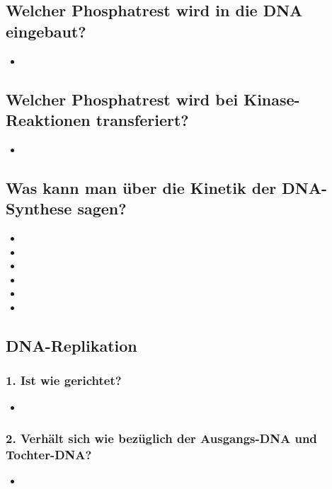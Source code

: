 \documentclass{article}
\begin{document}
\subsection*{Welcher Phosphatrest wird in die DNA eingebaut?}
\begin{itemize}     \item  \end{itemize}

\subsection*{Welcher Phosphatrest wird bei Kinase-Reaktionen transferiert?}
\begin{itemize}     \item  \end{itemize}
 
\subsection*{Was kann man über die Kinetik der DNA-Synthese sagen?}
\begin{itemize}
    \item 
    \item 
    \item 
    \item 
    \item 
    \item
\end{itemize} 

\subsection*{DNA-Replikation}
\subsubsection*{1. Ist wie gerichtet?} 
\begin{itemize}     \item  \end{itemize}

\subsubsection*{2. Verhält sich wie bezüglich der Ausgangs-DNA und Tochter-DNA?} 
\begin{itemize}     \item  \end{itemize}
\end{document}

